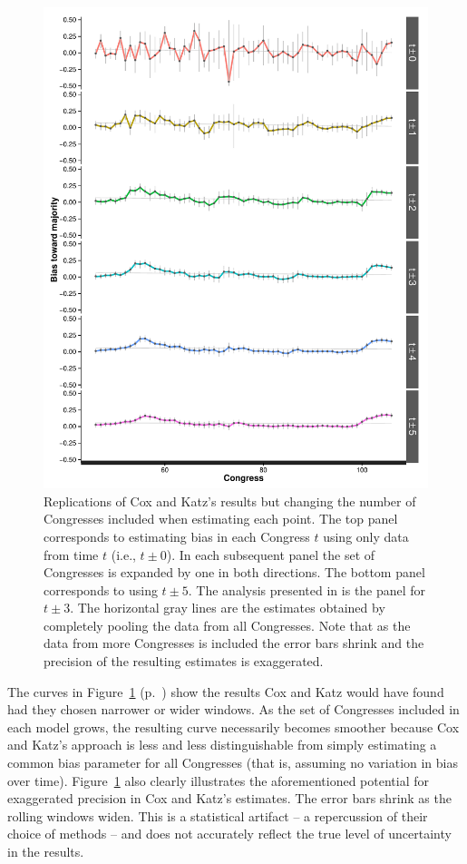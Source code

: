 \begin{figure}
\centering
\includegraphics[scale=0.75]{sections/figs/ck_windows}
\caption{Replications of Cox and Katz's results but changing the number of Congresses 
included when estimating each point. The top panel corresponds to estimating bias in each 
Congress $t$ using only data from time $t$ (i.e., $t \pm 0$). In each subsequent panel the 
set of Congresses is expanded by one in both directions. The bottom panel corresponds to 
using $t \pm 5$. The analysis presented in \protect{} is the 
panel for $t \pm 3$. The horizontal gray lines are the estimates obtained by completely 
pooling the data from all Congresses. Note that as the data from more Congresses is included 
the error bars shrink and the precision of the resulting estimates is exaggerated.}
\label{fig:ck_hypothetical}
\end{figure}


The curves in Figure~\ref{fig:ck_hypothetical} (p.~\pageref{fig:ck_hypothetical}) show the 
results Cox and Katz would have found had they chosen narrower or wider windows. As the 
set of Congresses included in each model grows, the resulting curve necessarily becomes 
smoother because Cox and Katz's approach is less and less distinguishable from simply 
estimating a common bias parameter for all Congresses (that is, assuming no variation in 
bias over time). Figure~\ref{fig:ck_hypothetical} also clearly illustrates the aforementioned potential 
for exaggerated precision in Cox and Katz's estimates. The error bars shrink as the rolling windows
widen. This is a statistical artifact -- a repercussion of their choice of methods -- and does not accurately 
reflect the true level of uncertainty in the results.  

